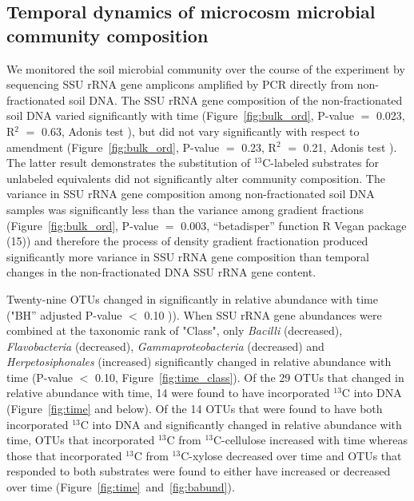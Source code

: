 \subsection{Temporal dynamics of microcosm microbial community composition}
We monitored the soil microbial community over the course of the experiment by
sequencing SSU rRNA gene amplicons amplified by PCR directly from
non-fractionated soil DNA. The SSU rRNA gene composition of the
non-fractionated soil DNA varied significantly with time
(Figure~\ref{fig:bulk_ord}, P-value $=$ 0.023, R$^{2}$ $=$ 0.63, Adonis test
\citet{Anderson2001a}), but did not vary significantly with respect to
amendment (Figure~\ref{fig:bulk_ord}, P-value $=$ 0.23, R$^{2}$ $=$ 0.21,
Adonis test \citet{Anderson2001a}). The latter result demonstrates the
substitution of $^{13}$C-labeled substrates for unlabeled equivalents did not
significantly alter community composition. The variance in SSU rRNA gene
composition among non-fractionated soil DNA samples was significantly less than
the variance among gradient fractions (Figure~\ref{fig:bulk_ord}, P-value $=$
0.003, “betadisper” function R Vegan package \citet{oksanen2007vegan} (15)) and
therefore the process of density gradient fractionation produced
significantly more variance in SSU rRNA gene composition than temporal
changes in the non-fractionated DNA SSU rRNA gene content.

Twenty-nine OTUs changed in significantly in relative abundance with time
("BH” adjusted P-value $<$ 0.10 \citet{YBenjamini1995})). When SSU rRNA
gene abundances were combined at the taxonomic rank of "Class", only
\textit{Bacilli} (decreased), \textit{Flavobacteria} (decreased),
\textit{Gammaproteobacteria} (decreased) and \textit{Herpetosiphonales}
(increased) significantly changed in relative abundance with time (P-value
$<$ 0.10, Figure~\ref{fig:time_class}). Of the 29 OTUs that changed in relative
abundance with time, 14 were found to have incorporated $^{13}$C into DNA
(Figure~\ref{fig:time} and below). Of the 14 OTUs that were found to have both
incorporated $^{13}$C into DNA and significantly changed in relative abundance
with time, OTUs that incorporated $^{13}$C from $^{13}$C-cellulose increased
with time whereas those that incorporated $^{13}$C from $^{13}$C-xylose
decreased over time and OTUs that responded to both substrates were found to
either have increased or decreased over time
(Figure~\ref{fig:time}~and~\ref{fig:babund}).

